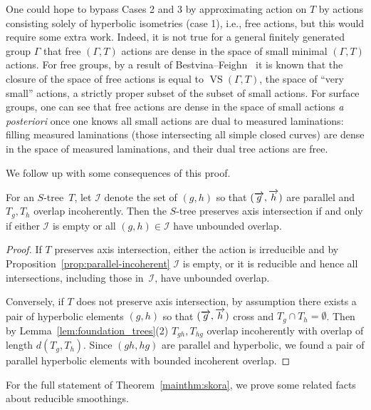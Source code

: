\begin{remark}
One could hope to bypass Cases 2 and 3 by approximating action on $T$ by actions consisting solely of hyperbolic isometries (case 1), i.e., free actions, but this would require some extra work.
Indeed, it is not true for a general finitely generated group $\Gamma$
that free $(\Gamma,T)$ actions are dense in the space of small minimal
$(\Gamma,T)$ actions. For free groups, by a result of
Bestvina--Feighn~\cite{BF11:OuterLimits} it is known that the closure
of the space of free actions is equal to
$\operatorname{VS}(\Gamma,T)$, the space of ``very small'' actions, a
strictly proper subset of the subset of small actions. For surface
groups, one can see that free actions are dense in the space of small
actions \emph{a posteriori} once one knows all small actions are dual
to measured laminations: filling measured laminations (those
intersecting all simple closed curves) are dense in the space of
measured laminations, and their dual tree actions are free.
\end{remark}

We follow up with some consequences of this proof.

\begin{proposition}
 \label{prop:preserves_axis}
  For an $S$-tree~$T$,
  let $\mathcal{I}$ denote the set of $(g,h)$ so that
  $(\overrightarrow{g},\overrightarrow{h})$ are parallel and $T_g,T_h$ overlap incoherently.
 Then the $S$-tree preserves axis intersection if and only if either $\mathcal{I}$ is empty or all $(g,h) \in \mathcal{I}$ have unbounded overlap.
\end{proposition}
\begin{proof}
If $T$ preserves axis intersection, either
the action is irreducible and by Proposition~\ref{prop:parallel-incoherent}
$\mathcal{I}$ is
empty, or it is reducible and hence all intersections, including those
in~$\mathcal{I}$, have unbounded overlap.

Conversely, if $T$ does not preserve axis intersection, by assumption
there exists a pair of hyperbolic elements
$(g,h)$ so that $(\overrightarrow{g},\overrightarrow{h})$ cross and $T_g \cap T_h =
\emptyset$. Then by Lemma~\ref{lem:foundation_trees}(2)
$T_{gh},T_{hg}$ overlap incoherently with overlap of length
$d(T_g,T_h)$. Since $(gh,hg)$ are parallel and hyperbolic, we
found a pair of parallel hyperbolic elements with bounded incoherent
overlap.
\end{proof}

For the full statement of Theorem~\ref{mainthm:skora},
we prove some related facts about reducible smoothings.

